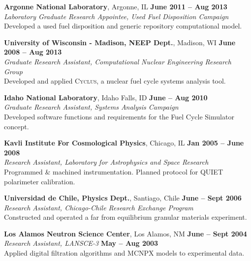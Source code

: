 \documentclass[margin,line]{resume}
\newcommand{\Cyclus}{\textsc{Cyclus}\xspace}%
\begin{document}
\begin{resume}
    \textbf{Argonne National Laboratory}, Argonne, IL \hfill \textbf{June 2011 -- Aug 2013}\\
		\textsl{Laboratory Graduate Research Appointee, Used Fuel Disposition Campaign}\\
		Developed a used fuel disposition and generic repository computational model.

    \textbf{University of Wisconsin - Madison, NEEP Dept.}, Madison, WI \hfill \textbf{June 2008 -- Aug 2013}\\
		\textsl{Graduate Research Assistant, Computational Nuclear Engineering Research Group}\\
		Developed and applied \Cyclus, a nuclear fuel cycle systems analysis tool.

    \textbf{Idaho National Laboratory}, Idaho Falls, ID \hfill \textbf{June -- Aug 2010}\\
		\textsl{Graduate Research Assistant, Systems Analysis Campaign}\\
		Developed software functions and requirements for the Fuel Cycle Simulator concept.

    \textbf{Kavli Institute For Cosmological Physics}, Chicago, IL \hfill \textbf{Jan 2005 -- June 2008}\\
                \textsl{Research Assistant, Laboratory for Astrophysics and Space Research}\\
                Programmed \& machined instrumentation. Planned protocol for QUIET polarimeter calibration.

    \textbf{Universidad de Chile, Physics Dept.}, Santiago, Chile \hfill \textbf{June -- Sept 2006}\\
                \textsl{Research Assistant, Chicago-Chile Research Exchange Program}\\
                 Constructed and operated a far from equilibrium granular materials experiment.

    \textbf{Los Alamos Neutron Science Center}, Los Alamos, NM \hfill \textbf{June -- Sept 2004}\\
                \textsl{Research Assistant, LANSCE-3} \hfill \textbf{May -- Aug 2003}\\
                Applied digital filtration algorithms and MCNPX models to experimental data.
    \pagebreak

               \vspace{-2mm}

\end{resume}
\end{document}

